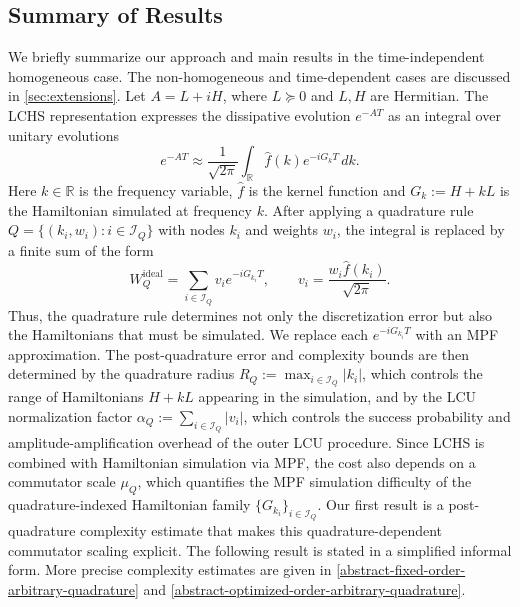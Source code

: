 \documentclass[10pt,reqno]{article}
\numberwithin{equation}{section}
\theoremstyle{plain}
\theoremstyle{definition}
\begin{document}
\subsection{Summary of Results}
We briefly summarize our approach and main results in the time-independent homogeneous case. The non-homogeneous and time-dependent cases are discussed in \cref{sec:extensions}. Let \(A=L+iH\), where \(L\succeq0\) and \(L,H\) are Hermitian. The LCHS representation expresses the dissipative evolution \(e^{-AT}\) as an integral over unitary evolutions
\begin{equation}\label{lchs-intro}
e^{-AT}\approx \frac{1}{\sqrt{2\pi}}\int_{\mathbb{R}} \hat f(k)e^{-iG_k T}\,dk.
\end{equation}
Here \(k\in\mathbb{R}\) is the frequency variable, $\hat f$ is the kernel function and \(G_k:=H+kL\) is the Hamiltonian simulated at frequency \(k\).  After applying a quadrature rule \(Q=\{(k_i,w_i):i\in\mathcal I_Q\}\) with nodes \(k_i\) and weights \(w_i\), the integral is replaced by a finite sum of the form
\begin{equation}
W_Q^{\operatorname{ideal}} = \sum_{i\in\mathcal I_Q}v_i e^{-iG_{k_i}T}, \qquad v_i = \frac{w_i\hat f(k_i)}{\sqrt{2\pi}}.
\end{equation}
Thus, the quadrature rule determines not only the discretization error but also the Hamiltonians that must be simulated. We replace each \(e^{-iG_{k_i}T}\) with an MPF approximation. The post-quadrature error and complexity bounds are then determined by the quadrature radius \(R_Q := \max_{i\in\mathcal I_Q}|k_i|\), which controls the range of Hamiltonians \(H+kL\) appearing in the simulation, and by the LCU normalization factor \(\alpha_Q := \sum_{i\in\mathcal I_Q}|v_i|\), which controls the success probability and amplitude-amplification overhead of the outer LCU procedure. Since LCHS is combined with Hamiltonian simulation via  MPF, the cost also depends on a commutator scale \(\mu_Q\), which quantifies the MPF simulation difficulty of the quadrature-indexed Hamiltonian family \(\{G_{k_i}\}_{i\in \mathcal I_Q}\). Our first result is a post-quadrature complexity estimate that makes this quadrature-dependent commutator scaling explicit.
The following result is stated in a simplified informal form. More precise complexity estimates are given in \cref{abstract-fixed-order-arbitrary-quadrature} and \cref{abstract-optimized-order-arbitrary-quadrature}. 
\end{document}
